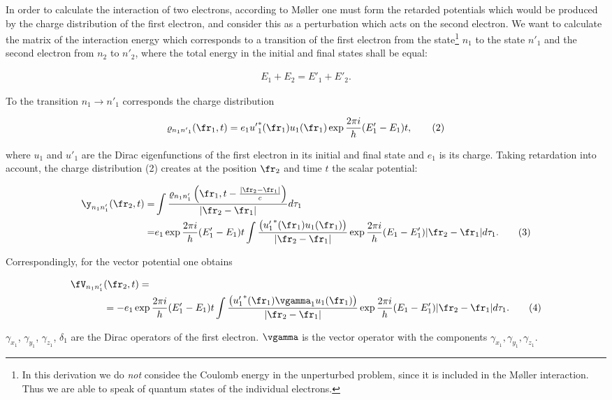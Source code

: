 \documentclass{article}
\newcommand{\nequ}[2]{
\begin{align*}
#1
\tag{#2}
\end{align*}
}
\begin{document}
In order to calculate the interaction of two electrons, according to Møller one must form the retarded potentials which would be produced by the charge distribution of the first electron, and consider this as a perturbation which acts on the second electron. We want to calculate the matrix of the interaction energy which corresponds to a transition of the first electron from the state\footnote{In this derivation we do \textit{not} considee the Coulomb energy in the unperturbed problem, since it is included in the Møller interaction. Thus we are able to speak of quantum states of the individual electrons.} $n_1$ to the state ${n'}_1$ and the second electron from $n_2$ to ${n'}_2$, where the total energy in the initial and final states shall be equal:
\nequ{
E_1+E_2 = E'_1 + E'_2.
}{1}
To the transition $n_1 \to {n'}_1$ corresponds the charge distribution
\nequ{
\varrho_{n_1 {n'}_1}(\fr_1, t) = e_1 {u'}_1^*(\fr_1)u_1(\fr_1)\exp{\frac{2\pi i}{h}(E'_1 - E_1)t},
}{2}
where $u_1$ and $u'_1$ are the Dirac eigenfunctions of the first electron in its initial and final state and $e_1$ is its charge. Taking retardation into account, the charge distribution (2) creates at the position $\fr_2$ and time $t$ the scalar potential:
\nequ{
\y_{n_1 n'_1}(\fr_2, t) =& \int{\frac{
\varrho_{n_1 n'_1}\left(\fr_1, t - \frac{|\fr_2 - \fr_1|}{c}\right)}
{|\fr_2-\fr_1|}{d\tau_1}}\\
 =& e_1 \exp{\frac{2\pi i}{h}(E'_1 - E_1)t}
 \int{\frac{\left({u'_1}^*(\fr_1)u_1(\fr_1)\right)}{|\fr_2-\fr_1|}
 \exp{\frac{2\pi i}{h}(E_1 - E'_1)|\fr_2 - \fr_1|}{d\tau_1}}.
}{3}
Correspondingly, for the vector potential one obtains
\nequ{
\fV_{n_1 n'_1}&(\fr_2, t) = \\
&= -e_1 \exp{\frac{2\pi i}{h}(E'_1 - E_1)t}
 \int{\frac{\left({u'_1}^*(\fr_1)\vgamma_1 u_1(\fr_1)\right)}{|\fr_2-\fr_1|}
 \exp{\frac{2\pi i}{h}(E_1 - E'_1)|\fr_2 - \fr_1|}{d\tau_1}}.
}{4}
$\gamma_{x_1}$, $\gamma_{y_1}$, $\gamma_{z_1}$, $\delta_1$ are the Dirac operators of the first electron. $\vgamma$ is the vector operator with the components $\gamma_{x_1},\gamma_{y_1},\gamma_{z_1}$.
\end{document}
